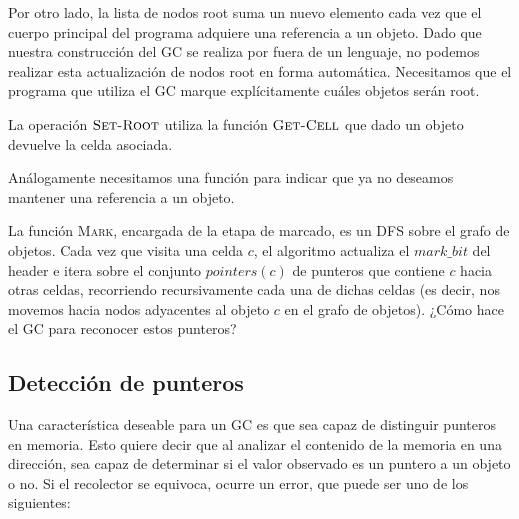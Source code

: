 Por otro lado, la lista de nodos root suma un nuevo elemento cada vez que el cuerpo principal del programa adquiere una referencia a un objeto. Dado que nuestra construcción del GC se realiza por fuera de un lenguaje, no podemos realizar esta actualización de nodos root en forma automática. Necesitamos que el programa que utiliza el GC marque explícitamente cuáles objetos serán root.

\begin{algorithm}
	\DontPrintSemicolon
	\Output{-}
 	\BlankLine
\caption{$\textsc{Set-Root}$}
\label{algo:algoritmo10}
\end{algorithm}

La operación $\textsc{Set-Root}$ utiliza la función $\textsc{Get-Cell}$ que dado un objeto devuelve la celda asociada.

Análogamente necesitamos una función para indicar que ya no deseamos mantener una referencia a un objeto.

\begin{algorithm}
	\DontPrintSemicolon
	\Output{-}
 	\BlankLine
\caption{$\textsc{Set-Null}$}
\label{algo:algoritmo11}
\end{algorithm}

La función \textsc{Mark}, encargada de la etapa de marcado, es un DFS sobre el grafo de objetos. Cada vez que visita una celda $c$, el algoritmo actualiza el $mark\_bit$ del header e itera sobre el conjunto $pointers(c)$ de punteros que contiene $c$ hacia otras celdas, recorriendo recursivamente cada una de dichas celdas (es decir, nos movemos hacia nodos adyacentes al objeto $c$ en el grafo de objetos). ¿Cómo hace el GC para reconocer estos punteros?

\subsection{Detección de punteros}

Una característica deseable para un GC es que sea capaz de distinguir punteros en memoria. Esto quiere decir que al analizar el contenido de la memoria en una dirección, sea capaz de determinar si el valor observado es un puntero a un objeto o no. Si el recolector se equivoca, ocurre un error, que puede ser uno de los siguientes:

